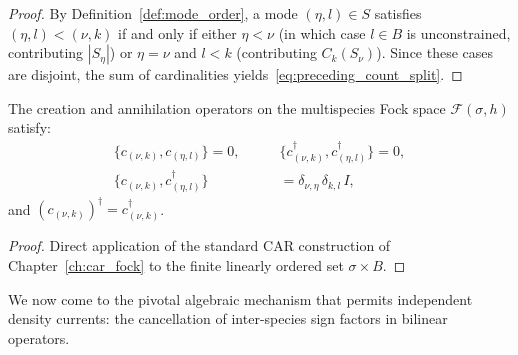 \begin{proof}
By Definition~\ref{def:mode_order}, a mode $(\eta, l) \in S$ satisfies $(\eta, l) < (\nu, k)$ if and only if either $\eta < \nu$ (in which case $l \in B$ is unconstrained, contributing $|S_\eta|$) or $\eta = \nu$ and $l < k$ (contributing $C_k(S_\nu)$). Since these cases are disjoint, the sum of cardinalities yields~\eqref{eq:preceding_count_split}.
\end{proof}

\begin{theorem}
\label{thm:multispecies_car}
The creation and annihilation operators on the multispecies Fock space $\mathcal{F}(\sigma, h)$ satisfy:
\begin{align}
\{c_{(\nu, k)}, c_{(\eta, l)}\} = 0, \qquad &\{c_{(\nu, k)}^\dagger, c_{(\eta, l)}^\dagger\} = 0, \\
\{c_{(\nu, k)}, c_{(\eta, l)}^\dagger\} &= \delta_{\nu, \eta}\, \delta_{k, l}\, I,
\end{align}
and $(c_{(\nu, k)})^\dagger = c_{(\nu, k)}^\dagger$.
\end{theorem}

\begin{proof}
Direct application of the standard CAR construction of Chapter~\ref{ch:car_fock} to the finite linearly ordered set $\sigma \times B$.
\end{proof}

We now come to the pivotal algebraic mechanism that permits independent density currents: the cancellation of inter-species sign factors in bilinear operators.

